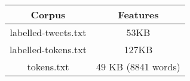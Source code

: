 
 \begin{tabular}{|c|c|} 
 \hline
 Corpus & Features \\ [0.5ex] 
 \hline\hline
 labelled-tweets.txt & 53KB \\ 
\hline
labelled-tokens.txt & 127KB \\
 \hline
 tokens.txt & 49 KB (8841 words) \\
 \hline
\end{tabular}